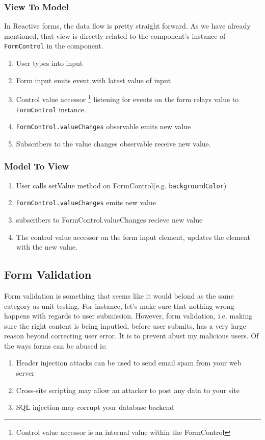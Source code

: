 \subsubsection{View To Model}
In Reactive forms, the data flow is pretty straight forward. As we have already
mentioned, that view is directly related to the component's instance of 
\lstinline{FormControl} in the component. 
\begin{enumerate}
  \item User types into input
  \item Form input emits event with latest value of input
  \item Control value accessor \footnote{Control value accessor is an internal value within the 
  FormControl} listening for events on the form relays value 
  to \lstinline{FormControl} instance. 
  \item \lstinline{FormControl.valueChanges} observable emits new value 
  \item Subscribers to the value changes observable receive new value. 
\end{enumerate}

\subsubsection{ Model To View }
\begin{enumerate}
  \item User calls setValue method on FormControl(e.g. \lstinline{backgroundColor})
  \item \lstinline{FormControl.valueChanges} emits new value
  \item subscribers to FormControl.valueChanges recieve new value
  \item The control value accessor on the form input element, updates the 
  element with the new value. 
\end{enumerate}

\subsection{Form Validation}
Form validation is something that seems like it would belond as the same 
category as unit testing. For instance, let's make sure that nothing wrong 
happens with regards to user submission. However, form validation, i.e. 
making sure the right content is being inputted, before user submits, has a 
very large reason beyond correcting user error. It is to prevent abust my 
malicious users. Of the ways forms can be abused is: 
\begin{enumerate}
  \item Header injection attacks can be used to send email spam from your web 
  server
  \item Cross-site scripting may allow an attacker to post any data to your 
  site
  \item SQL injection may corrupt your database backend
\end{enumerate}


